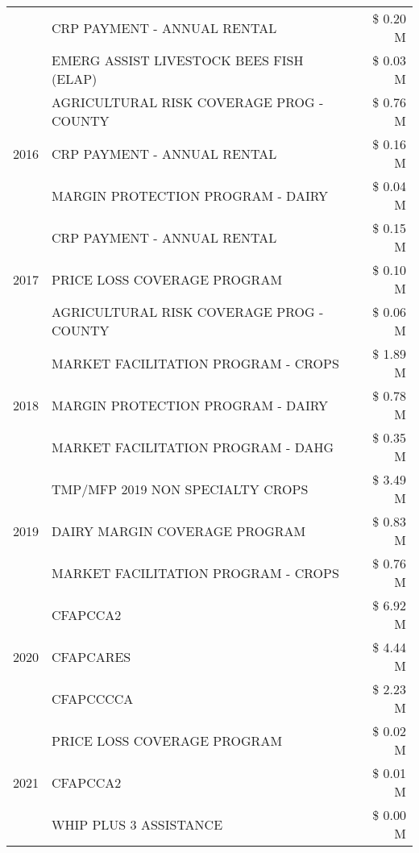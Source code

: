 \begin{tabular}{llr}
 & CRP PAYMENT - ANNUAL RENTAL & \$ 0.20 M \\
 & EMERG ASSIST LIVESTOCK BEES FISH (ELAP) & \$ 0.03 M \\
\cline{1-3}
\multirow[t]{3}{*}{2016} & AGRICULTURAL RISK COVERAGE PROG - COUNTY & \$ 0.76 M \\
 & CRP PAYMENT - ANNUAL RENTAL & \$ 0.16 M \\
 & MARGIN PROTECTION PROGRAM - DAIRY & \$ 0.04 M \\
\cline{1-3}
\multirow[t]{3}{*}{2017} & CRP PAYMENT - ANNUAL RENTAL & \$ 0.15 M \\
 & PRICE LOSS COVERAGE PROGRAM & \$ 0.10 M \\
 & AGRICULTURAL RISK COVERAGE PROG - COUNTY & \$ 0.06 M \\
\cline{1-3}
\multirow[t]{3}{*}{2018} & MARKET FACILITATION PROGRAM - CROPS & \$ 1.89 M \\
 & MARGIN PROTECTION PROGRAM - DAIRY & \$ 0.78 M \\
 & MARKET FACILITATION PROGRAM - DAHG & \$ 0.35 M \\
\cline{1-3}
\multirow[t]{3}{*}{2019} & TMP/MFP 2019 NON SPECIALTY CROPS & \$ 3.49 M \\
 & DAIRY MARGIN COVERAGE PROGRAM & \$ 0.83 M \\
 & MARKET FACILITATION PROGRAM - CROPS & \$ 0.76 M \\
\cline{1-3}
\multirow[t]{3}{*}{2020} & CFAPCCA2 & \$ 6.92 M \\
 & CFAPCARES & \$ 4.44 M \\
 & CFAPCCCCA & \$ 2.23 M \\
\cline{1-3}
\multirow[t]{3}{*}{2021} & PRICE LOSS COVERAGE PROGRAM & \$ 0.02 M \\
 & CFAPCCA2 & \$ 0.01 M \\
 & WHIP PLUS 3 ASSISTANCE & \$ 0.00 M \\
\cline{1-3}
\bottomrule
\end{tabular}
